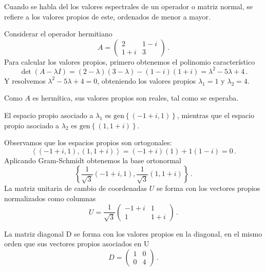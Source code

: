 Cuando se habla del los valores espectrales de un operador o matriz normal, se refiere a los valores propios de este, ordenados de menor a mayor.

\begin{eje}
  Considerar el operador hermitiano
  \[
    A = \begin{pmatrix} 2 & 1-i \\ 1+i & 3 \end{pmatrix}\,.
  \]
  Para calcular los valores propios, primero obtenemos el polinomio característico
  \[
    \det(A - \lambda I) = (2-\lambda)(3-\lambda) - (1-i)(1+i) = \lambda^2 - 5\lambda + 4\,.
  \]
  Y resolvemos $\lambda^2 - 5\lambda + 4 = 0$, obteniendo los valores propios $\lambda_1 = 1$ y $\lambda_2 = 4$.

  Como $A$ es hermítica, sus valores propios son reales, tal como se esperaba.

  El espacio propio asociado a $\lambda_1$ es $\text{gen}\left\{(-1+i, 1)\right\}$, mientras que el espacio propio asociado a $\lambda_2$ es $\text{gen}\left\{(1, 1+i)\right\}$.

  Observamos que los espacios propios son ortogonales:
  \[
    \left\langle (-1+i, 1), (1, 1+i) \right\rangle = (-1+i)(1) + 1(1-i) = 0\,.
  \]
  Aplicando Gram-Schmidt obtenemos la base ortonormal
  \[
    \left\{\frac{1}{\sqrt{3}}(-1+i, 1), \frac{1}{\sqrt{3}}(1, 1+i)\right\}\,.
  \]
  La matriz unitaria de cambio de coordenadas $U$ se forma con los vectores propios normalizados como columnas
  \[
    U = \frac{1}{\sqrt{3}}\begin{pmatrix} -1+i & 1   \\
                1    & 1+i\end{pmatrix}\,.
  \]

  La matriz diagonal D se forma con los valores propios en la diagonal, en el mismo orden que sus vectores propios asociados en U
  \[
    D = \begin{pmatrix} 1 & 0 \\ 0 & 4 \end{pmatrix}\,.
  \]


\end{eje}
